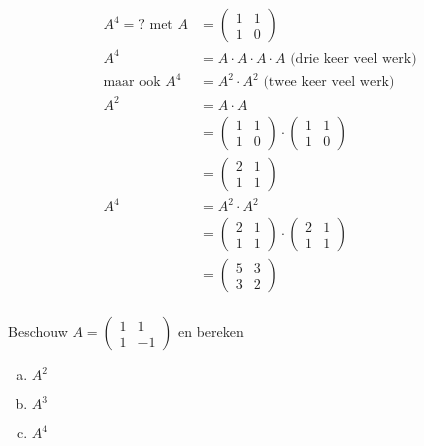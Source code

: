 \documentclass[12pt,twoside]{article}
\begin{document}
\begin{align*}
  A^4 = ? \mbox{ met } A &= \begin{pmatrix}1 & 1\\ 1 & 0\end{pmatrix}\\
  A^4 &= A \cdot A \cdot A \cdot A \mbox{ (drie keer veel werk)}\\
  \mbox{maar ook } A^4 &= A^2 \cdot A^2 \mbox{ (twee keer veel werk)}\\
  A^2 &= A \cdot A\\
    &= \begin{pmatrix}1 & 1\\ 1 & 0\end{pmatrix} \cdot \begin{pmatrix}1 & 1\\ 1 & 0\end{pmatrix}\\
    &= \begin{pmatrix}2 & 1\\ 1 & 1\end{pmatrix}\\
  A^4 &= A^2 \cdot A^2\\
    &= \begin{pmatrix}2 & 1\\ 1 & 1\end{pmatrix} \cdot \begin{pmatrix}2 & 1\\ 1 & 1\end{pmatrix}\\
    &= \begin{pmatrix}5 & 3\\ 3 & 2\end{pmatrix}\\
\end{align*}

\begin{oefening}
Beschouw $A=\begin{pmatrix}1 & 1\\ 1 & -1\end{pmatrix}$ en bereken
\begin{multicols}{3}
\begin{enumerate}[(a)]
\item $A^2$
\item $A^3$
\item $A^4$
\end{enumerate}
\end{multicols}
\end{oefening}
\end{document}

